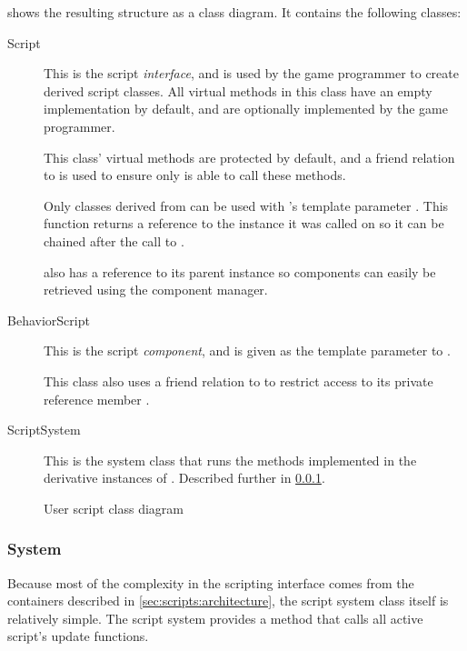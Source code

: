 \documentclass{projdoc}
\begin{document}
 shows the resulting structure as a class diagram. It
contains the following classes:\noparbreak
\begin{description}
	\item[Script] This is the script \emph{interface}, and is used by the game
		programmer to create derived script classes. All virtual methods in this class
		have an empty implementation by default, and are optionally implemented by the
		game programmer.

		This class' virtual methods are protected by default, and a friend relation to
		 is used to ensure only  is
		able to call these methods.

		Only classes derived from  can be used with
		's template parameter . This
		function returns a reference to the  instance it was
		called on so it can be chained after the call to
		.

		 also has a reference to its parent
		 instance so components can easily be retrieved using
		the component manager.
	\item[BehaviorScript]
		This is the script \emph{component}, and is given as the template parameter to
		.

		This class also uses a friend relation to  to restrict
		access to its private reference member .
	\item[ScriptSystem] This is the system class that runs the methods implemented in
		the derivative instances of . Described further in
		\cref{sec:scripts:sytem}.
\end{description}

\begin{figure}
	\centering
	\caption{User script class diagram}
	\label{fig:class-scripts}
\end{figure}

\subsubsection{System}
\label{sec:scripts:sytem}

Because most of the complexity in the scripting interface comes from the containers
described in \cref{sec:scripts:architecture}, the script system class itself is
relatively simple. The script system provides a method
 that calls all active script's update functions.
\end{document}
